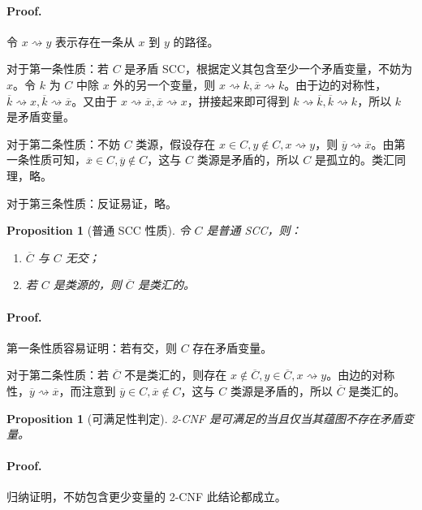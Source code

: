 \documentclass[10pt,a4paper,oneside]{article}
\newtheorem{proposition}[definition]{Proposition}
\begin{document}
\paragraph{Proof.}

令 $x\rightsquigarrow y$ 表示存在一条从 $x$ 到 $y$ 的路径。

对于第一条性质：若 $C$ 是矛盾 SCC，根据定义其包含至少一个矛盾变量，不妨为 $x$。令 $k$ 为 $C$ 中除 $x$ 外的另一个变量，则 $x\rightsquigarrow k, \overline{x}\rightsquigarrow k$。由于边的对称性，$\overline{k}\rightsquigarrow x, \overline{k}\rightsquigarrow \overline{x}$。又由于 $x\rightsquigarrow \overline{x}, \overline{x}\rightsquigarrow x$，拼接起来即可得到 $k\rightsquigarrow\overline{k}, \overline{k}\rightsquigarrow k$，所以 $k$ 是矛盾变量。

对于第二条性质：不妨 $C$ 类源，假设存在 $x\in C, y\not\in C, x \rightsquigarrow y$，则 $\overline{y} \rightsquigarrow \overline{x}$。由第一条性质可知，$\overline{x}\in C, \overline{y}\not\in C$，这与 $C$ 类源是矛盾的，所以 $C$ 是孤立的。类汇同理，略。

对于第三条性质：反证易证，略。

\begin{proposition}[普通 SCC 性质]
    令 $C$ 是普通 SCC，则：
    \begin{enumerate}
        \item $\overline{C}$ 与 $C$ 无交；
        \item 若 $C$ 是类源的，则 $\overline{C}$ 是类汇的。
    \end{enumerate}
\end{proposition}

\paragraph{Proof.} 第一条性质容易证明：若有交，则 $C$ 存在矛盾变量。

对于第二条性质：若 $\overline{C}$ 不是类汇的，则存在 $x\not \in \overline{C}, y \in \overline{C}, x\rightsquigarrow y$。由边的对称性，$\overline{y}\rightsquigarrow \overline{x}$，而注意到 $\overline{y} \in C, \overline{x} \not\in C$，这与 $C$ 类源是矛盾的，所以 $\overline{C}$ 是类汇的。

\begin{proposition}[可满足性判定]
    2-CNF 是可满足的当且仅当其蕴图不存在矛盾变量。
\end{proposition}

\paragraph{Proof.} 归纳证明，不妨包含更少变量的 2-CNF 此结论都成立。
\end{document}
